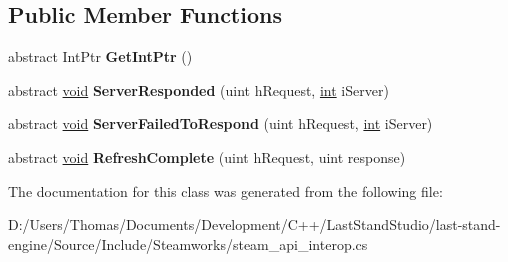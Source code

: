 \subsection*{Public Member Functions}
\begin{DoxyCompactItemize}
\item 
\hypertarget{classValve_1_1Steamworks_1_1ISteamMatchmakingServerListResponse_a5644de4108eb1f90e428edbed6cc7a5e}{}abstract Int\+Ptr {\bfseries Get\+Int\+Ptr} ()\label{classValve_1_1Steamworks_1_1ISteamMatchmakingServerListResponse_a5644de4108eb1f90e428edbed6cc7a5e}

\item 
\hypertarget{classValve_1_1Steamworks_1_1ISteamMatchmakingServerListResponse_a7f8ce9bd12a9c599efbbb10a55a67032}{}abstract \hyperlink{SDL__audio_8h_a52835ae37c4bb905b903cbaf5d04b05f}{void} {\bfseries Server\+Responded} (uint h\+Request, \hyperlink{SDL__thread_8h_a6a64f9be4433e4de6e2f2f548cf3c08e}{int} i\+Server)\label{classValve_1_1Steamworks_1_1ISteamMatchmakingServerListResponse_a7f8ce9bd12a9c599efbbb10a55a67032}

\item 
\hypertarget{classValve_1_1Steamworks_1_1ISteamMatchmakingServerListResponse_a2df8a9094f7a7623211f5e115c02bf6a}{}abstract \hyperlink{SDL__audio_8h_a52835ae37c4bb905b903cbaf5d04b05f}{void} {\bfseries Server\+Failed\+To\+Respond} (uint h\+Request, \hyperlink{SDL__thread_8h_a6a64f9be4433e4de6e2f2f548cf3c08e}{int} i\+Server)\label{classValve_1_1Steamworks_1_1ISteamMatchmakingServerListResponse_a2df8a9094f7a7623211f5e115c02bf6a}

\item 
\hypertarget{classValve_1_1Steamworks_1_1ISteamMatchmakingServerListResponse_ab5ad02f172b4f9dda9c758b6303a6259}{}abstract \hyperlink{SDL__audio_8h_a52835ae37c4bb905b903cbaf5d04b05f}{void} {\bfseries Refresh\+Complete} (uint h\+Request, uint response)\label{classValve_1_1Steamworks_1_1ISteamMatchmakingServerListResponse_ab5ad02f172b4f9dda9c758b6303a6259}

\end{DoxyCompactItemize}


The documentation for this class was generated from the following file\+:\begin{DoxyCompactItemize}
\item 
D\+:/\+Users/\+Thomas/\+Documents/\+Development/\+C++/\+Last\+Stand\+Studio/last-\/stand-\/engine/\+Source/\+Include/\+Steamworks/steam\+\_\+api\+\_\+interop.\+cs\end{DoxyCompactItemize}
